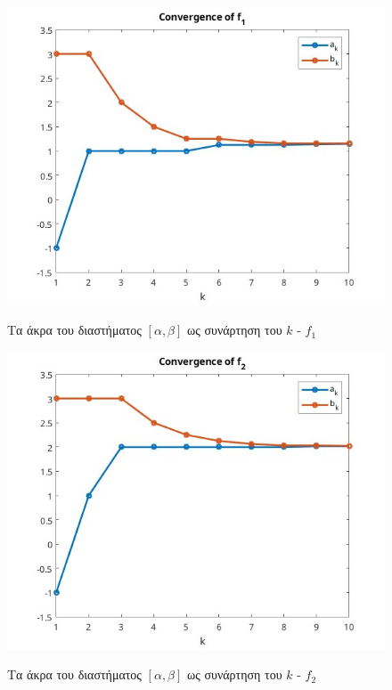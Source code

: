 \begin{figure}[H]
    \includegraphics[scale=0.7]{plots/ex1/f1.jpg}
    \label{fig:funcs}
    \caption{Τα άκρα του διαστήματος $[\alpha, \beta]$ ως συνάρτηση του $k$ - $f_1$}
    \centering
\end{figure}

\begin{figure}[H]
    \includegraphics[scale=0.7]{plots/ex1/f2.jpg}
    \label{fig:funcs}
    \caption{Τα άκρα του διαστήματος $[\alpha, \beta]$ ως συνάρτηση του $k$ - $f_2$}
    \centering
\end{figure}

